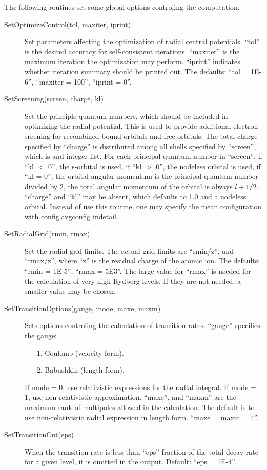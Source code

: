 \documentclass[12pt]{article}
\begin{document}
The following routines set some global options controling the computation.
\begin{description}
\item[SetOptimizeControl(tol, maxiter, iprint)] 
Set parameters affecting the optimization of radial central potentials. 
``tol'' is the desired accuracy for self-consistent iterations. ``maxiter'' is
the maximum iteration the optimization may perform. ``iprint'' indicates
whether iteration summary should be printed out. The defaults: ``tol = 1E-6'',
``maxiter = 100'', ``iprint = 0''. 

\item[SetScreening(screen, charge, kl)] 
Set the principle quantum numbers, which should be included in optimizing the
radial potential. This is used to provide additional electron sreening for
recombined bound orbitals and free orbitals. The total charge specified by
``charge'' is distributed among all shells specified by ``screen'', which is
and integer list. For each principal quantum number in ``screen'', if ``kl $<$
0'', the s-orbital is used, if ``kl $>$ 0'', the nodeless orbital is used, if
``kl = 0'', the orbital angular momentum is the principal quantum number
divided by 2, the total angular momentum of the orbital is always
$l+1/2$.  ``charge'' and ``kl'' may be absent, which defaults to 1.0 and a
nodeless orbital. Instead of use this routine, one may specify the mean
configuration with config.avgconfig indetail. 

\item[SetRadialGrid(rmin, rmax)]
Set the radial grid limits. The actual grid limits are ``rmin/z'', and 
``rmax/z'', where ``z'' is the residual charge of the atomic ion. The
defaults: ``rmin = 1E-5'', ``rmax = 5E3''. The large value for ``rmax'' is
needed for the calculation of very high Rydberg levels. If they are not needed,
a smaller value may be chosen. 

\item[SetTransitionOptions(gauge, mode, maxe, maxm)] Sets options controling
the calculation of transition rates. ``gauge'' specifies the gauge: 
\begin{enumerate}
\item[1.] Coulomb (velocity form).
\item[2.] Babushkin (length form). 
\end{enumerate}
If mode = 0, use relativistic expressions
for the radial integral. If mode = 1, use non-relativistic approximation. 
``maxe'', and ``maxm'' are the maximum rank of multipoles allowed in the
calculation. The default is to use non-relativistic radial expression in
length form. ``maxe = maxm = 4''. 

\item[SetTransitionCut(eps)] 
When the transition rate is less than ``eps'' fraction of the total decay rate
for a given level, it is omitted in the output. Default: ``eps = 1E-4''. 

\end{description}
\end{document}
